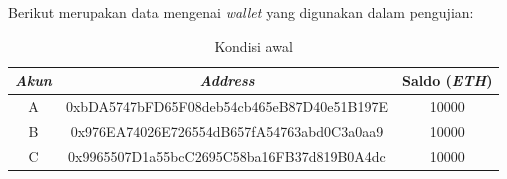 Berikut merupakan data mengenai \emph{wallet} yang digunakan dalam pengujian:

\begin{longtable}{|c|c|c|}
    \caption{Kondisi awal}
    \label{tb:EnergiKecepatan}                                   \\
    \hline
    \rowcolor[HTML]{C0C0C0}
    \textbf{\emph{Akun}} & \textbf{\emph{Address}} & \textbf{Saldo (\emph{ETH})}\\
    \hline
    A & 0xbDA5747bFD65F08deb54cb465eB87D40e51B197E            & 10000               \\
    B & 0x976EA74026E726554dB657fA54763abd0C3a0aa9            & 10000               \\
    C & 0x9965507D1a55bcC2695C58ba16FB37d819B0A4dc            & 10000               \\
    \hline
  \end{longtable}


